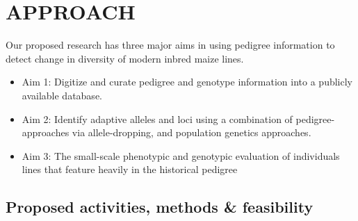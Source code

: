 \documentclass[12pt]{article}
\begin{document}
\section*{APPROACH}
\label{S:3}
Our proposed research has three major aims in using pedigree information to detect change in diversity of modern inbred maize lines.




\begin{itemize}
\item Aim 1: Digitize and curate pedigree and genotype information into a publicly available database. 
\item Aim 2: Identify adaptive alleles and loci using a combination of pedigree-approaches via allele-dropping, and population genetics approaches.
\item Aim 3: The small-scale phenotypic and genotypic evaluation of individuals lines that feature heavily in the historical pedigree

 
\end{itemize}
\subsection*{Proposed activities, methods \& feasibility}
\end{document}
